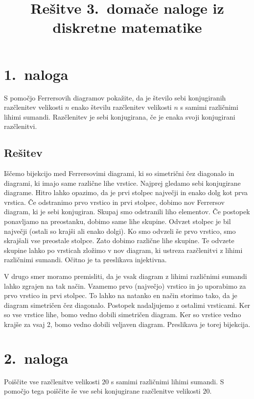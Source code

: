 \documentclass[11pt]{article}
\title{Rešitve 3.\ domače naloge iz diskretne matematike}
\author{}
\date{}
\begin{document}
\maketitle

\section*{1.~naloga}
S pomočjo Ferrersovih diagramov pokažite, da je število sebi konjugiranih razčlenitev velikosti \(n\) enako številu razčlenitev velikosti \(n\) 
s samimi različnimi lihimi sumandi. Razčlenitev
je sebi konjugirana, če je enaka svoji konjugirani razčlenitvi.

\subsection*{Rešitev}
Iščemo bijekcijo med Ferrersovimi diagrami, ki so simetrični čez diagonalo in diagrami, ki imajo same različne lihe vrstice.
Najprej gledamo sebi konjugirane diagrame.
Hitro lahko opazimo, da je prvi stolpec največji in enako dolg kot prva vrstica. Če odstranimo prvo vrstico in prvi stolpec, 
dobimo nov Ferrersov diagram, ki je sebi konjugiran. Skupaj smo odstranili liho elementov. Če postopek ponavljamo na preostanku,
dobimo same lihe skupine. Odvzet stolpec je bil največji (ostali so krajši ali enako dolgi). Ko smo odvzeli še prvo vrstico,
smo skrajšali vse preostale stolpce. Zato dobimo različne lihe skupine. Te odvzete skupine lahko po vrsticah zložimo v nov diagram,
ki ustreza razčlenitvi z lihimi različnimi sumandi. Očitno je ta preslikava injektivna.

V drugo smer moramo premisliti, da je vsak diagram z lihimi različnimi sumandi lahko zgrajen na tak način.
Vzamemo prvo (največjo) vrstico in jo uporabimo za prvo vrstico in prvi stolpec. To lahko na natanko en način storimo tako,
da je diagram simetričen čez diagonalo. Postopek nadaljujemo z ostalimi vrsticami. Ker so vse vrstice lihe, bomo vedno dobili
simetričen diagram. Ker so vrstice vedno krajše za vsaj 2, bomo vedno dobili veljaven diagram. Preslikava je torej bijekcija.

\section*{2.~naloga}
Poiščite vse razčlenitve velikosti \(20\) s samimi različnimi lihimi sumandi. S pomočjo tega
poiščite še vse sebi konjugirane razčlenitve velikosti \(20\).
\end{document}
